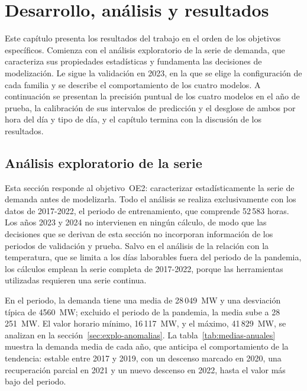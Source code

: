 
\chapter{Desarrollo, análisis y resultados}\label{cap:resultados}

Este capítulo presenta los resultados del trabajo en el orden de los
objetivos específicos. Comienza con el análisis exploratorio de la serie de
demanda, que caracteriza sus propiedades estadísticas y fundamenta las
decisiones de modelización. Le sigue la validación en 2023, en la que se
elige la configuración de cada familia y se describe el comportamiento de los
cuatro modelos. A continuación se presentan la precisión puntual de los
cuatro modelos en el año de prueba, la calibración de sus intervalos de
predicción y el desglose de ambos por hora del día y tipo de día, y el
capítulo termina con la discusión de los resultados.

\section{Análisis exploratorio de la serie}\label{sec:exploratorio}

Esta sección responde al objetivo~OE2: caracterizar estadísticamente la
serie de demanda antes de modelizarla. Todo el análisis se realiza
exclusivamente con los datos de 2017-2022, el periodo de entrenamiento, que
comprende 52\,583 horas. Los años 2023 y 2024 no intervienen en ningún
cálculo, de modo que las decisiones que se derivan de esta sección no
incorporan información de los periodos de validación y prueba. Salvo en el
análisis de la relación con la temperatura, que se limita a los días
laborables fuera del periodo de la pandemia, los cálculos emplean la serie
completa de 2017-2022, porque las herramientas utilizadas requieren una serie
continua.

En el periodo, la demanda tiene una media de 28\,049~MW y una desviación
típica de 4560~MW; excluido el periodo de la pandemia, la media sube a 28\,251~MW. El
valor horario mínimo, 16\,117~MW, y el máximo, 41\,829~MW, se analizan en la
sección~\ref{sec:explo-anomalias}. La tabla~\ref{tab:medias-anuales} muestra
la demanda media de cada año, que anticipa el comportamiento de la tendencia:
estable entre 2017 y 2019, con un descenso marcado en 2020, una recuperación
parcial en 2021 y un nuevo descenso en 2022, hasta el valor más bajo del
periodo.

